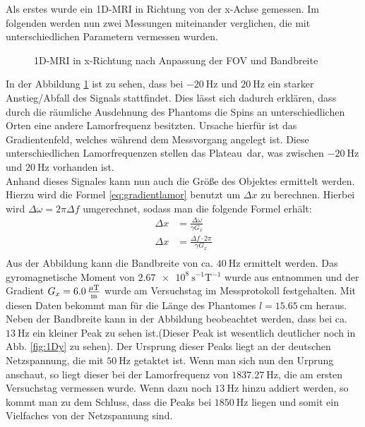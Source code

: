 Als erstes wurde ein 1D-MRI in Richtung von der x-Achse gemessen. Im folgenden werden nun zwei Messungen miteinander verglichen, die mit unterschiedlichen Parametern vermessen wurden.  
\begin{figure}[H]
    \centering
    
    \caption{1D-MRI in x-Richtung nach Anpassung der FOV und Bandbreite}\label{fig:1Dx}
\end{figure}
In der Abbildung \ref{fig:1Dx} ist zu sehen, dass bei $\SI{-20}{\hertz}$ und $\SI{20}{\hertz}$ ein starker Anstieg/Abfall des Signals stattfindet. Dies lässt sich dadurch erklären, dass durch die räumliche Ausdehnung des Phantoms die Spins an unterschiedlichen Orten eine andere Lamorfrequenz besitzten. Ursache hierfür ist das Gradientenfeld, welches während dem Messvorgang angelegt ist. Diese unterschiedlichen Lamorfrequenzen stellen das \glqq Plateau\grqq \, dar, was zwischen $\SI{-20}{\hertz}$ und $\SI{20}{\hertz}$ vorhanden ist.\\
Anhand dieses Signales kann  nun auch die Größe des Objektes ermittelt werden. Hierzu wird die Formel \ref{eq:gradientlamor} benutzt um $\Delta x$ zu berechnen. Hierbei wird $\Delta\omega= 2\pi \Delta f$ umgerechnet, sodass man die folgende Formel erhält:
\begin{align}
    \Delta x&=\frac{\Delta\omega}{\gamma G_x}\\
    \Delta x&=\frac{\Delta f \cdot 2\pi}{\gamma G_x}\\
\end{align}\label{eq:FOV}
Aus der Abbildung kann die Bandbreite von ca. $\SI{40}{\hertz}$ ermittelt werden. Das gyromagnetische Moment von $\SI{2.67e8}{\s^{-1}\tesla^{-1}}$ wurde aus \cite{Schmidt} entnommen und der Gradient $G_x=\SI{6,0}{\frac{\mu\tesla}{\m}}$ wurde am Versuchstag im Messprotokoll festgehalten. Mit diesen Daten bekommt man für die Länge des Phantomes $l=\SI{15,65}{\centi\m}$ heraus.\\
Neben der Bandbreite kann in der Abbildung beobeachtet werden, dass bei ca. $\SI{13}{\hertz}$ ein kleiner Peak zu sehen ist.(Dieser Peak ist wesentlich deutlicher noch in Abb. \ref{fig:1Dy} zu sehen). Der Ursprung dieser Peaks liegt an der deutschen Netzspannung, die mit $\SI{50}{\hertz}$ getaktet ist. Wenn man sich nun den Urprung anschaut, so liegt dieser bei der Lamorfrequenz von $\SI{1837,27}{\hertz}$, die am ersten Versuchstag vermessen wurde. Wenn dazu noch $\SI{13}{\hertz}$ hinzu addiert werden, so  kommt man zu dem Schluss, dass die Peaks bei $\SI{1850}{\hertz}$ liegen und somit ein Vielfaches von der Netzspannung sind.\\
